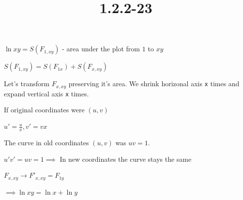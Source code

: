 \documentclass{article}
\title{1.2.2-23}
\begin{document}
\maketitle

\( \ln{xy} = S(F_{1,xy}) \) - area under the plot from \( 1 \) to \( xy \)

\( S(F_{1,xy}) = S(F_{1x}) + S(F_{x,xy}) \)

Let's transform \( F_{x,xy} \) preserving it's area. We shrink horizonal axis \texttt{x} times and expand vertical axis \texttt{x} times.

If original coordinates were \( (u,v) \)

\( u'=\frac{u}{x}, v'=vx \)

The curve in old coordinates \( (u,v) \) was \( uv = 1 \).

\( u'v'=uv=1 \implies \) In new coordinates the curve stays the same

\( F_{x,xy} \to F'_{x,xy} = F_{1y} \)

\( \implies \ln{xy} = \ln{x} + \ln{y} \)
\end{document}
